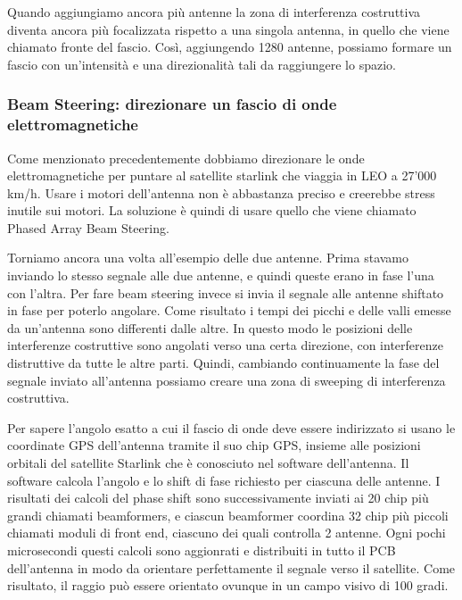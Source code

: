 Quando aggiungiamo ancora più antenne la zona di interferenza costruttiva diventa ancora più focalizzata rispetto a una singola antenna, in quello che viene chiamato fronte del fascio.
Così, aggiungendo 1280 antenne, possiamo formare un fascio con un'intensità e una direzionalità tali da raggiungere lo spazio.\cite{branch_education_how_2022}


\subsubsection{Beam Steering: direzionare un fascio di onde elettromagnetiche}
Come menzionato precedentemente dobbiamo direzionare le onde elettromagnetiche per puntare al satellite starlink che viaggia in \ac{LEO} a 27'000 km/h.
Usare i motori dell'antenna non è abbastanza preciso e creerebbe stress inutile sui motori.
La soluzione è quindi di usare quello che viene chiamato Phased Array Beam Steering.

Torniamo ancora una volta all'esempio delle due antenne.
Prima stavamo inviando lo stesso segnale alle due antenne, e quindi queste erano in fase l'una con l'altra.
Per fare beam steering invece si invia il segnale alle antenne shiftato in fase per poterlo angolare.
Come risultato i tempi dei picchi e delle valli emesse da un'antenna sono differenti dalle altre.
In questo modo le posizioni delle interferenze costruttive sono angolati verso una certa direzione, con interferenze distruttive da tutte le altre parti.
Quindi, cambiando continuamente la fase del segnale inviato all'antenna possiamo creare una zona di sweeping di interferenza costruttiva.

Per sapere l'angolo esatto a cui il fascio di onde deve essere indirizzato si usano le coordinate GPS dell'antenna tramite il suo chip GPS, insieme alle posizioni orbitali del satellite Starlink che è conosciuto nel software dell'antenna.
Il software calcola l'angolo e lo shift di fase richiesto per ciascuna delle antenne.
I risultati dei calcoli del phase shift sono successivamente inviati ai 20 chip più grandi chiamati beamformers, e ciascun beamformer coordina 32 chip più piccoli chiamati moduli di front end, ciascuno dei quali controlla 2 antenne.
Ogni pochi microsecondi questi calcoli sono aggionrati e distribuiti in tutto il PCB dell'antenna in modo da orientare perfettamente il segnale verso il satellite.
Come risultato, il raggio può essere orientato ovunque in un campo visivo di 100 gradi.\cite{branch_education_how_2022}


